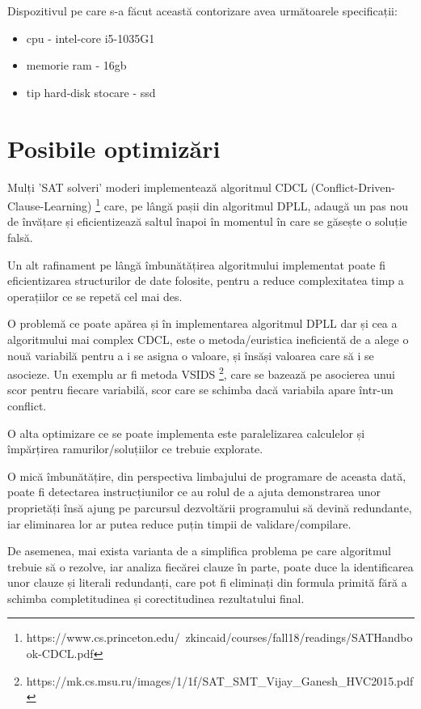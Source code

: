 Dispozitivul pe care s-a făcut această contorizare avea următoarele specificații:
\begin{itemize}
	\item cpu - intel-core i5-1035G1
	\item memorie ram - 16gb
	\item tip hard-disk stocare - ssd
\end{itemize}



\section{Posibile optimizări}

Mulți 'SAT solveri' moderi implementează algoritmul CDCL (Conflict-Driven-Clause-Learning) \footnote{https://www.cs.princeton.edu/~zkincaid/courses/fall18/readings/SATHandbook-CDCL.pdf}
 care, pe lângă pașii din algoritmul DPLL, adaugă un pas nou de învățare și eficientizează saltul înapoi în momentul în care se găsește o soluție falsă.

Un alt rafinament pe lângă îmbunătățirea algoritmului implementat poate fi eficientizarea structurilor de date folosite, pentru a reduce complexitatea timp a operațiilor ce se repetă cel mai des.

O problemă ce poate apărea și în implementarea algoritmul DPLL dar și cea a algoritmului mai complex CDCL, este o metoda/euristica ineficientă de a alege o nouă variabilă pentru a i se asigna o valoare, și însăși valoarea care să i se asocieze. Un exemplu ar fi metoda VSIDS 
\footnote{https://mk.cs.msu.ru/images/1/1f/SAT\_SMT\_Vijay\_Ganesh\_HVC2015.pdf}, care se bazează pe asocierea unui scor pentru fiecare variabilă, scor care se schimba dacă variabila apare într-un conflict. 

O alta optimizare ce se poate implementa este paralelizarea calculelor și împărțirea ramurilor/soluțiilor ce trebuie explorate.

O mică îmbunătățire, din perspectiva limbajului de programare de aceasta dată, poate fi detectarea instrucțiunilor ce au rolul de a ajuta demonstrarea unor proprietăți însă ajung pe parcursul dezvoltării programului să devină redundante, iar eliminarea lor ar putea reduce puțin timpii de validare/compilare.

De asemenea, mai exista varianta de a simplifica problema pe care algoritmul trebuie să o rezolve, iar analiza fiecărei clauze în parte, poate duce la identificarea unor clauze și literali redundanți, care pot fi eliminați din formula primită fără a schimba completitudinea și corectitudinea rezultatului final.